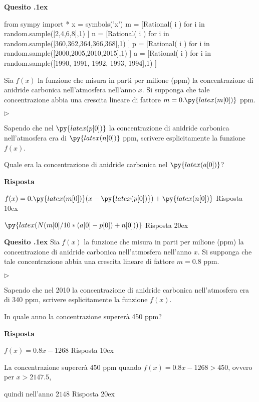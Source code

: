 \documentclass[11pt,twoside,a4paper]{article}
\newcommand{\mylabel}[1]{#1\hfill}
\renewenvironment{itemize}
  {\begin{list}{$\triangleright$}{%
   \setlength{\parskip}{0mm}
   \setlength{\topsep}{.4\baselineskip}
   \setlength{\rightmargin}{0mm}
   \setlength{\listparindent}{0mm}
   \setlength{\itemindent}{0mm}
   \setlength{\labelwidth}{2ex}
   \setlength{\itemsep}{.4\baselineskip}
   \setlength{\parsep}{0mm}
   \setlength{\partopsep}{0mm}
   \setlength{\labelsep}{1ex}
   \setlength{\leftmargin}{\labelwidth+\labelsep}
   \let\makelabel\mylabel}}{%
   \end{list}\vspace*{-1.3mm}}
\newcounter{quesito}
\newenvironment{question}{\bigskip\addtocounter{quesito}{1}\bigskip\bigskip\par\textbf{Quesito \thequesito.\kern1ex}}{\vspace{\parskip}}
\newenvironment{answer}{\par\textbf{Risposta\quad}}{\vspace{\parskip}}
\begin{document}
\begin{question}
\begin{pycode}
from sympy import *
x = symbols('x')
m = [Rational( i ) for i in random.sample([2,4,6,8],1) ]
n = [Rational( i ) for i in random.sample([360,362,364,366,368],1) ]
p = [Rational( i ) for i in random.sample([2000,2005,2010,2015],1) ]
a = [Rational( i ) for i in random.sample([1990, 1991, 1992, 1993, 1994],1) ]
\end{pycode}
Sia $f(x)$ la funzione che misura in parti per milione (ppm) la concentrazione di anidride carbonica nell'atmosfera nell'anno $x$. Si supponga che tale concentrazione abbia una crescita lineare di fattore $m = 0.\py{latex(m[0])}$ ppm.
\begin{itemize}
\item[1.] Sapendo che nel $\py{latex(p[0])}$ la concentrazione di anidride carbonica nell'atmosfera era di $\py{latex(n[0])}$ ppm, scrivere esplicitamente la funzione $f(x)$.
\item[2.] Quale era la concentrazione di anidride carbonica nel $\py{latex(a[0])}$?
\end{itemize}
\begin{answer}

\smallskip
{\color{blue}
$f(x) = 0.\py{latex(m[0])} ( x - \py{latex(p[0])}) + \py{latex(n[0])}$
\hfill Risposta 1\kern0ex}

{\color{blue}
$\py{latex(N(m[0]/10*(a[0]-p[0])+n[0]))}$
\hfill Risposta 2\kern0ex}

\end{answer}
\end{question}
\begin{question}
Sia $f(x)$ la funzione che misura in parti per milione (ppm) la concentrazione di anidride carbonica nell'atmosfera nell'anno $x$. Si supponga che tale concentrazione abbia una crescita lineare di fattore $m = 0.8$ ppm.
\begin{itemize}
\item[1.] Sapendo che nel 2010 la concentrazione di anidride carbonica nell'atmosfera era di 340 ppm, scrivere esplicitamente la funzione $f(x)$.
\item[2.] In quale anno la concentrazione supererà 450 ppm?
\end{itemize}
\begin{answer}

\smallskip
{\color{blue}
$f(x) = 0.8 x - 1268$
\hfill Risposta 1\kern0ex}

La concentrazione supererà 450 ppm quando $f(x) = 0.8x - 1268 > 450$, ovvero per $x > 2147.5$, 

quindi nell'anno
{\color{blue}
$2148$
\hfill Risposta 2\kern0ex}

\end{answer}
\end{question}
\end{document}
